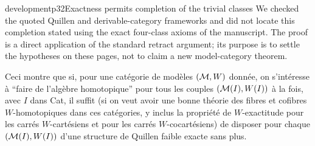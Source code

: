 \begin{dcomment}{development}{p32}{Exactness permits completion of the trivial classes}
We checked the quoted Quillen and derivable-category frameworks and did not locate this completion stated using the exact four-class axioms of the manuscript. The proof is a direct application of the standard retract argument; its purpose is to settle the hypotheses on these pages, not to claim a new model-category theorem.
\end{dcomment}


Ceci montre que si, pour une catégorie de modèles $(\mathcal{M},W)$ donnée, on s'intéresse à “faire de l'algèbre homotopique” pour tous les couples $(\mathcal{M}(I),W(I))$ à la fois, avec $I$ dans Cat, il suffit (si on veut avoir une bonne théorie des fibres et cofibres $W$-homotopiques dans ces catégories, y inclus la propriété de $W$-exactitude pour les carrés $W$-cartésiens et pour les carrés $W$-cocartésiens) de disposer pour chaque $(\mathcal{M}(I),W(I))$ d'une structure de Quillen faible exacte sans plus.

